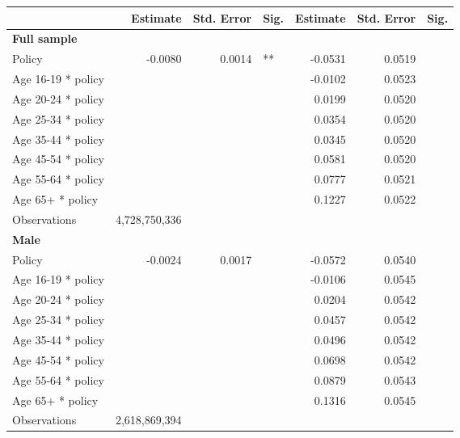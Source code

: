 
\begin{table}%
\centering 
\begin{tabular}{l r r l r r l} 

\hline 
 
 & Estimate & Std. Error & Sig. & Estimate & Std. Error & Sig. \\ 

\hline 
 
\textbf{Full sample} \\ 

Policy             &  -0.0080        &  0.0014       &   **       &  -0.0531        &  0.0519       &            \\ 
Age 16-19 * policy           & & &  &  -0.0102        &  0.0523       &            \\ 
Age 20-24 * policy           & & &  &  0.0199        &  0.0520       &            \\ 
Age 25-34 * policy           & & &  &  0.0354        &  0.0520       &            \\ 
Age 35-44 * policy           & & &  &  0.0345        &  0.0520       &            \\ 
Age 45-54 * policy           & & &  &  0.0581        &  0.0520       &            \\ 
Age 55-64 * policy           & & &  &  0.0777        &  0.0521       &            \\ 
Age 65+ * policy           & & &  &  0.1227        &  0.0522       &            \\ 
Observations & 4,728,750,336 \\ 


\hline 

\textbf{Male} \\ 

Policy             &  -0.0024        &  0.0017       &            &  -0.0572        &  0.0540       &            \\ 
Age 16-19 * policy           & & &  &  -0.0106        &  0.0545       &            \\ 
Age 20-24 * policy           & & &  &  0.0204        &  0.0542       &            \\ 
Age 25-34 * policy           & & &  &  0.0457        &  0.0542       &            \\ 
Age 35-44 * policy           & & &  &  0.0496        &  0.0542       &            \\ 
Age 45-54 * policy           & & &  &  0.0698        &  0.0542       &            \\ 
Age 55-64 * policy           & & &  &  0.0879        &  0.0543       &            \\ 
Age 65+ * policy           & & &  &  0.1316        &  0.0545       &            \\ 
Observations & 2,618,869,394 \\ 



\end{tabular}
\end{table}
